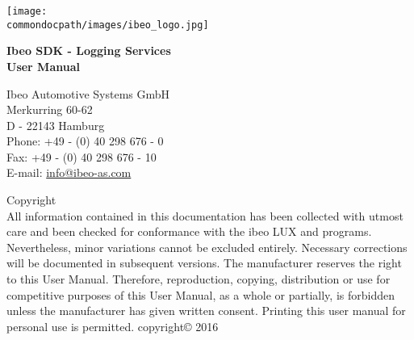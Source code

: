 \newpage
{}
\thispagestyle{plain}

\begin{center}
\vspace*{3cm}
\texttt{[image: \\commondocpath/images/ibeo\_logo.jpg]}
\vspace*{\fill}
\end{center}

\newpage



\thispagestyle{plain}
\vspace*{6cm}
\begin{bfseries}
\begin{huge}
\huge \bfseries \noindent Ibeo SDK - Logging Services\\ [1.5cm]
\huge \bfseries User Manual
\end{huge}
\end{bfseries}
\newpage
\thispagestyle{plain}

\newpage
\begin{bfseries} 
\null
\vfill
\begin{centering}Ibeo Automotive Systems GmbH\\
Merkurring 60-62\\
D - 22143 Hamburg\\
Phone: +49 - (0) 40 298 676 - 0\\
Fax: +49 - (0) 40 298 676 - 10\\
E-mail: \href{mailto:info@ibeo-as.com}{info@ibeo-as.com}
\vspace*{1.0cm}
 
Copyright\\
\mdseries 
All information contained in this documentation has been collected with utmost care and been checked for conformance with the ibeo LUX and programs. Nevertheless, minor variations cannot be excluded entirely. Necessary corrections will be documented in subsequent versions. The manufacturer reserves the right to this User Manual. Therefore, reproduction, copying, distribution or use for competitive purposes of this User Manual, as a whole or partially, is forbidden unless the manufacturer has given written consent.
Printing this user manual for personal use is permitted.
copyright© 2016
\end{centering}
\end{bfseries}

